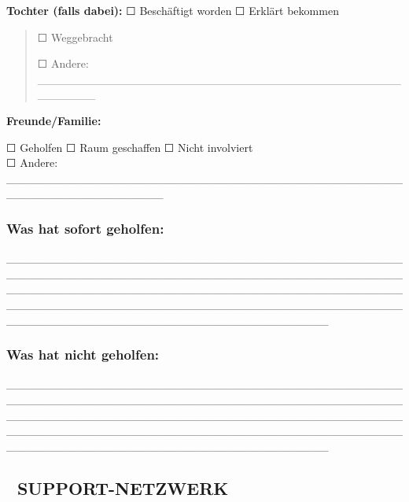 \textbf{Tochter (falls dabei):} ☐ Beschäftigt worden ☐ Erklärt bekommen

\begin{quote}
☐ Weggebracht

☐ Andere: \_\_\_\_\_\_\_\_\_\_\_\_\_\_\_\_\_\_\_\_\_\_\_\_\_\_\_\_\_\_\_\_\_\_\_\_\_\_\_\_\_\_\_\_\_\_\_\_\_\_\_
\end{quote}

\textbf{Freunde/Familie:}

☐ Geholfen ☐ Raum geschaffen ☐ Nicht involviert\\
☐ Andere: \_\_\_\_\_\_\_\_\_\_\_\_\_\_\_\_\_\_\_\_\_\_\_\_\_\_\_\_\_\_\_\_\_\_\_\_\_\_\_\_\_\_\_\_\_\_\_\_\_\_\_\_\_\_\_\_\_\_\_\_\_\_\_\_\_\_\_

\hypertarget{was-hat-sofort-geholfen}{%
\subsubsection{\texorpdfstring{\textbf{Was hat sofort geholfen:}}{Was hat sofort geholfen:}}\label{was-hat-sofort-geholfen}}

\_\_\_\_\_\_\_\_\_\_\_\_\_\_\_\_\_\_\_\_\_\_\_\_\_\_\_\_\_\_\_\_\_\_\_\_\_\_\_\_\_\_\_\_\_\_\_\_\_\_\_\_\_\_\_\_\_\_\_\_\_\_\_\_\_\_\_\_\_\_\_\_\_\_\_\_\_\_\_\_\_\_\_\_\_\_\_\_\_\_\_\_\_\_\_\_\_\_\_\_\_\_\_\_\_\_\_\_\_\_\_\_\_\_\_\_\_\_\_\_\_\_\_\_\_\_\_\_\_\_\_\_\_\_\_\_\_\_\_\_\_\_\_\_\_\_\_\_\_\_\_\_\_\_\_\_\_\_\_\_\_\_\_\_\_\_\_\_\_\_\_\_\_\_\_\_\_\_\_\_\_\_\_\_\_\_\_\_\_\_\_\_\_\_\_\_\_\_\_\_\_\_\_\_\_\_\_\_\_\_\_\_\_\_\_\_\_\_\_\_\_\_\_\_\_\_\_\_\_\_\_

\hypertarget{was-hat-nicht-geholfen}{%
\subsubsection{\texorpdfstring{\textbf{Was hat nicht geholfen:}}{Was hat nicht geholfen:}}\label{was-hat-nicht-geholfen}}

\_\_\_\_\_\_\_\_\_\_\_\_\_\_\_\_\_\_\_\_\_\_\_\_\_\_\_\_\_\_\_\_\_\_\_\_\_\_\_\_\_\_\_\_\_\_\_\_\_\_\_\_\_\_\_\_\_\_\_\_\_\_\_\_\_\_\_\_\_\_\_\_\_\_\_\_\_\_\_\_\_\_\_\_\_\_\_\_\_\_\_\_\_\_\_\_\_\_\_\_\_\_\_\_\_\_\_\_\_\_\_\_\_\_\_\_\_\_\_\_\_\_\_\_\_\_\_\_\_\_\_\_\_\_\_\_\_\_\_\_\_\_\_\_\_\_\_\_\_\_\_\_\_\_\_\_\_\_\_\_\_\_\_\_\_\_\_\_\_\_\_\_\_\_\_\_\_\_\_\_\_\_\_\_\_\_\_\_\_\_\_\_\_\_\_\_\_\_\_\_\_\_\_\_\_\_\_\_\_\_\_\_\_\_\_\_\_\_\_\_\_\_\_\_\_\_\_\_\_\_\_

\hypertarget{support-netzwerk}{%
\subsection{\texorpdfstring{\textbf{👥 SUPPORT-NETZWERK}}{👥 SUPPORT-NETZWERK}}\label{support-netzwerk}}

